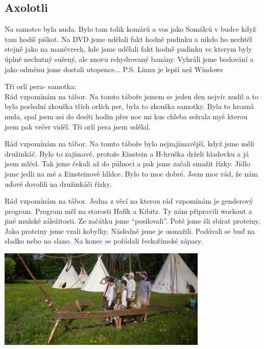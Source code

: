 \subsection*{Axolotli} %
\label{sub:axolotli}

\begin{multicols}{2}

Na samotce byla nuda. Bylo tam tolik komárů a vos jako Somálců v budce když tam hodíš piškot. Na DVD jsme udělali fakt hodně pudinku a nikdo ho nechtěl  stejně jako na manévrech, kde jsme udělali fakt hodně pudinku ve kterym byly úplně nechutný sušený, ale znovu rehydrovaný banány. Vyhráli jsme bodování a jako odměnu jsme dostali utopence...
P.S. Linux je lepší než Windows





Tři orlí pera- samotka:\\
Rád vzpomínám na tábor. Na tomto táboře jsmem se jeden den nejvíc nudil a to bylo poslední zkouška třích orlích per, byla to zkouška samotky. Byla to hrozná nuda, spal jsem asi do desíti hodin přes noc mi kus chleba sežrala myš kterou jsem pak večer viděl. Tři orlí pera jsem udělal.


\columnbreak

Rád vzpomínám na tábor. Na tomto táboře bylo nejzajímavější, když jsme měli družinkáč. Bylo to zajímavé, protože Einstein a H-hruška drželi hladovku a já jsem mlčel. Tak jsme čekali až do půlnoci a pak jsme začali smažit řízky. Jídlo jsme jedli na mé a Einsteinově hlídce. Bylo to moc dobré. Jsem moc rád, že nám uďové dovolili na družinkáči řízky.



Rád vzpomínám na tábor. Jedna z věcí na kterou rád vzpomínám je genderový program. Program měl na starosti Hafík a Kibitz. Ty nám připravili workout a jiné mužské záležitosti. Ze začátku jsme “posilovali”. Poté jsme šli sbírat proteiny. Jako proteiny jsme vzali kobylky. Následně jsme je usmažili. Podávali se buď na sladko nebo na slano. Na konec se pořádali řeckořímské zápasy.

\end{multicols}

\begin{center}

\includegraphics[width=10cm]{img/druziny/axolotli.jpg}

\end{center}


